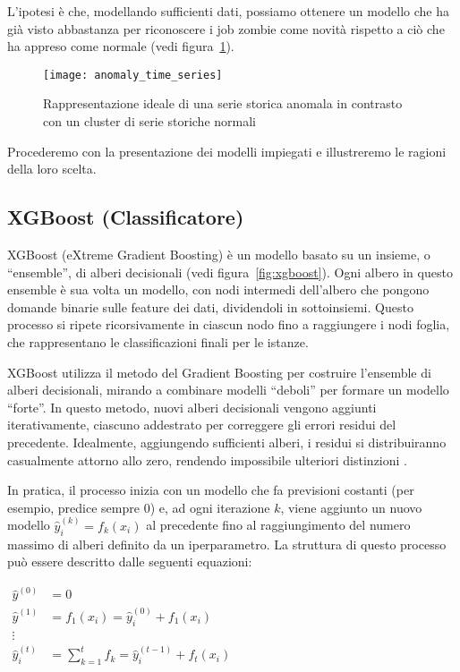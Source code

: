 L'ipotesi è che, modellando sufficienti dati, possiamo ottenere un modello che
ha già visto abbastanza per riconoscere i job zombie come novità rispetto a
ciò che ha appreso come normale (vedi figura~\ref{fig:anomaly_detection}).

\begin{figure}[!ht]
    \centering
    \texttt{[image: anomaly\_time\_series]}
    \caption{Rappresentazione ideale di una serie storica anomala in contrasto
    con un cluster di serie storiche normali}
    \label{fig:anomaly_detection}
\end{figure}

Procederemo con la presentazione dei modelli impiegati e illustreremo le
ragioni della loro scelta.

\subsection{XGBoost (Classificatore)}

XGBoost (eXtreme Gradient Boosting) è un modello basato su un insieme, o
``ensemble'', di alberi decisionali (vedi figura~\ref{fig:xgboost}). Ogni
albero in questo ensemble è sua volta un modello, con nodi intermedi
dell'albero che pongono domande binarie sulle feature dei dati, dividendoli in
sottoinsiemi. Questo processo si ripete ricorsivamente in ciascun nodo fino a
raggiungere i nodi foglia, che rappresentano le classificazioni finali per le
istanze.

XGBoost utilizza il metodo del Gradient Boosting per costruire l'ensemble di
alberi decisionali, mirando a combinare modelli ``deboli'' per formare un
modello ``forte''. In questo metodo, nuovi alberi decisionali vengono aggiunti
iterativamente, ciascuno addestrato per correggere gli errori residui del
precedente. Idealmente, aggiungendo sufficienti alberi, i residui si
distribuiranno casualmente attorno allo zero, rendendo impossibile ulteriori
distinzioni \cite{breiman1997, friedman2001}.

In pratica, il processo inizia con un modello che fa previsioni costanti (per
esempio, predice sempre 0) e, ad ogni iterazione $k$, viene aggiunto un nuovo
modello $\hat{y}_i^{(k)}=f_k(x_i)$ al precedente fino al raggiungimento del
numero massimo di alberi definito da un iperparametro. La struttura di questo
processo può essere descritto dalle seguenti equazioni:

\begin{center}
    \begin{math}
        \begin{aligned}
            \hat{y}^{(0)} &=0 \\ 
            \hat{y}^{(1)}&=f_1(x_i)=\hat{y}_i^{(0)}+f_1(x_i)\\ 
            \vdots \\ 
            \hat{y}_i^{(t)}&=\sum_{k=1}^{t}f_k=\hat{y}_i^{(t-1)}+f_t(x_i)
        \end{aligned}
    \end{math}
\end{center}

